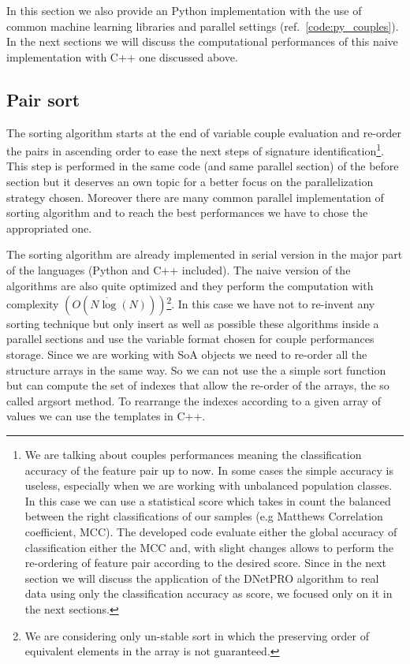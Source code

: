 \documentclass{standalone}
\begin{document}
In this section we also provide an  Python implementation with the use of common machine learning libraries and parallel settings (ref.~\ref{code:py_couples}).
In the next sections we will discuss the computational performances of this naive implementation with C++ one discussed above.



\subsection[Sorting]{Pair sort}\label{implementation:sort}

The sorting algorithm starts at the end of variable couple evaluation and re-order the pairs in ascending order to ease the next steps of signature identification\footnote{
  We are talking about couples performances meaning the classification accuracy of the feature pair up to now.
  In some cases the simple accuracy is useless, especially when we are working with unbalanced population classes.
  In this case we can use a statistical score which takes in count the balanced between the right classifications of our samples (e.g Matthews Correlation coefficient, MCC).
  The developed code evaluate either the global accuracy of classification either the MCC and, with slight changes allows to perform the re-ordering of feature pair according to the desired score.
  Since in the next section we will discuss the application of the DNetPRO algorithm to real data using only the classification accuracy as score, we focused only on it in the next sections.
}.
This step is performed in the same code (and same parallel section) of the before section but it deserves an own topic for a better focus on the parallelization strategy chosen.
Moreover there are many common parallel implementation of sorting algorithm and to reach the best performances we have to chose the appropriated one.

The sorting algorithm are already implemented in serial version in the major part of the languages (Python and C++ included).
The naive version of the algorithms are also quite optimized and they perform the computation with complexity $(O(N\dot\log(N)))$\footnote{
  We are considering only un-stable sort in which the preserving order of equivalent elements in the array is not guaranteed.
}.
In this case we have not to re-invent any sorting technique but only insert as well as possible these algorithms inside a parallel sections and use the variable format chosen for couple performances storage.
Since we are working with SoA objects we need to re-order all the structure arrays in the same way.
So we can not use the a simple sort function but can compute the set of indexes that allow the re-order of the arrays, the so called \textsf{argsort} method.
To rearrange the indexes according to a given array of values we can use the templates in C++.
\end{document}
